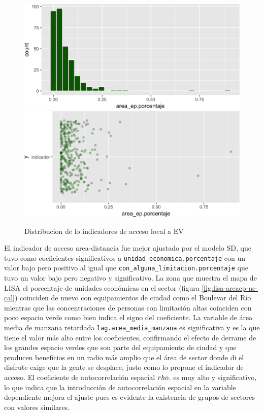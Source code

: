 \documentclass[12pt,]{book}
\begin{document}
\begin{figure}
\includegraphics[width=1\linewidth]{tesis-unigis_files/figure-latex/hist-areaep-1} \includegraphics[width=1\linewidth]{tesis-unigis_files/figure-latex/hist-areaep-2} \caption{Distribucion de lo indicadores de acceso local a EV }\label{fig:hist-areaep}
\end{figure}

El indicador de acceso area-distancia fue mejor ajustado por el modelo
SD, que tuvo como coeficientes significativos a
\texttt{unidad\_economica.porcentaje} con un valor bajo pero positivo al
igual que \texttt{con\_alguna\_limitacion.porcentaje} que tuvo un valor
bajo pero negativo y significativo. La zona que muestra el mapa de LISA
el porcentaje de unidades económicas en el sector (figura
\ref{fig:lisa-areaep-ue-cal}) coinciden de nuevo con equipamientos de
ciudad como el Boulevar del Río mientras que las concentraciones de
personas con limitación altas coinciden con poco espacio verde como bien
indica el signo del coeficiente. La variable de área media de manzana
retardada \texttt{lag.area\_media\_manzana} es significativa y es la que
tiene el valor más alto entre los coeficientes, confirmando el efecto de
derrame de los grandes espacio verdes que son parte del equipamiento de
ciudad y que producen beneficios en un radio más amplio que el área de
sector donde di el disfrute exige que la gente se desplace, justo como
lo propone el indicador de acceso. El coeficiente de autocorrelación
espacial \(\\rho\). es muy alto y significativo, lo que indica que la
introducción de autocorrelación espacial en la variable dependiente
mejora el ajuste pues es evidente la existencia de grupos de sectores
con valores similares.
\end{document}
